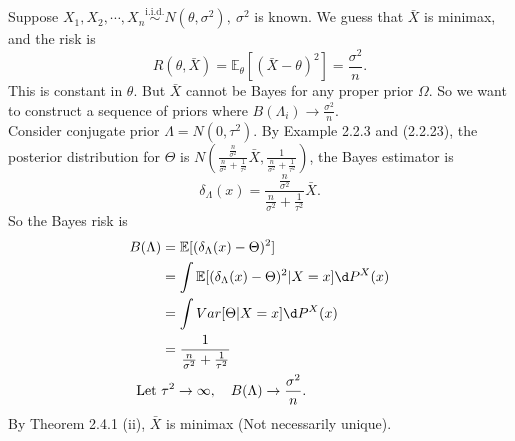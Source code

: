 \documentclass[a4paper]{article}
\begin{document}
\begin{eg}
	Suppose $X_1, X_2, \cdots, X_n \stackrel{\text{i.i.d.}}{\sim} N(\theta,\sigma^2), \ \sigma^2$ is known. We guess that $\bar{X}$ is minimax, and the risk is
	\begin{equation}
		R(\theta,\bar{X}) = \mathbb{E}_\theta[(\bar{X} - \theta)^2] = \frac{\sigma^2}{n}.
	\end{equation}
	This is constant in $\theta$. But $\bar{X}$ cannot be Bayes for any proper prior $\Omega$. So we want to construct a sequence of priors where $B(\Lambda_i) \to \frac{\sigma^2}{n}$. \\
	Consider conjugate prior $\Lambda = N(0,\tau^2)$. By Example 2.2.3 and (2.2.23), the posterior distribution for $\Theta$ is $N\left(\frac{\frac{n}{\sigma^2}}{\frac{n}{\sigma^2} + \frac{1}{\tau^2}} \bar{X}, \frac{1}{\frac{n}{\sigma^2} + \frac{1}{\tau^2}}\right)$, the Bayes estimator is
	\begin{equation}
		\delta_{\Lambda}(x) = \frac{\frac{n}{\sigma^2}}{\frac{n}{\sigma^2} + \frac{1}{\tau^2}} \bar{X}.
	\end{equation}
	So the Bayes risk is
	\begin{equation}
		\begin{aligned}
			B(\Lambda) &= \mathbb{E}[(\delta_{\Lambda}(x) - \Theta)^2] \\
			&= \int \mathbb{E}[(\delta_{\Lambda}(x) - \Theta)^2 | X =x] \d P^X (x) \\
			&= \int Var[\Theta| X =x] \d P^X (x) \\
			&= \frac{1}{\frac{n}{\sigma^2} + \frac{1}{\tau^2}} \\
			\text{Let } & \tau^2 \to \infty, \quad B(\Lambda) \to \frac{\sigma^2}{n}.
		\end{aligned}	
	\end{equation} 
	By Theorem 2.4.1 (ii), $\bar{X}$ is minimax (Not necessarily unique).
\end{eg}
\end{document}
